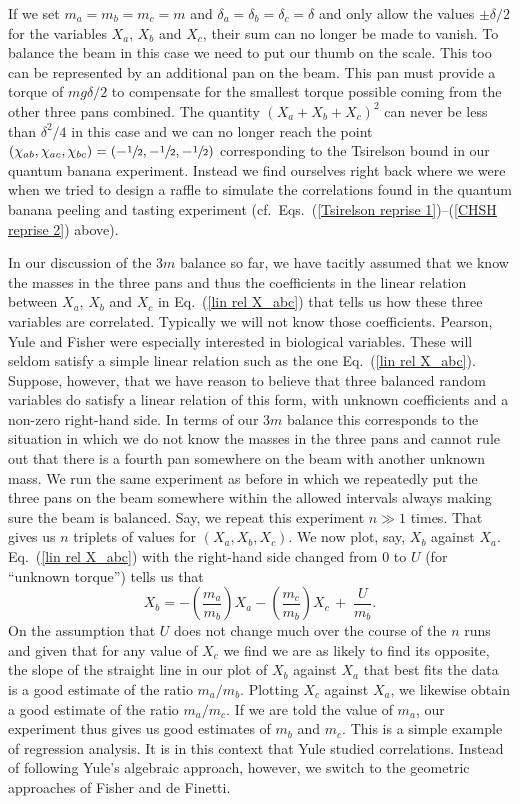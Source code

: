 If we set $m_a = m_b = m_ c =m$ and $\delta_a = \delta_b = \delta_c = \delta$  and only allow the values $\pm \delta/2$ for the variables $X_a$, $X_b$ and $X_c$, their sum can no longer be made to vanish. To balance the beam in this case we need to put our thumb on the scale. This too can be represented by an additional pan on the beam. This pan must provide a torque of $mg\delta/2$ to compensate for the smallest torque possible coming from the other three pans combined. The quantity $\left(X_a + X_b + X_c \right)^2$ can never be less than $\delta^2/4$ in this case and we can no longer reach the point $(\chi_{ab}, \chi_{ac}, \chi_{bc}) = 
(-\sfrac12, -\sfrac12, -\sfrac12)$ corresponding to the Tsirelson bound in our quantum banana experiment. Instead we find ourselves right back where we were when we tried to design a raffle to simulate the correlations found in the quantum banana peeling and tasting experiment (cf.\ Eqs.\ (\ref{Tsirelson reprise 1})--(\ref{CHSH reprise 2}) above). 

In our discussion of the 3$m$ balance so far, we have tacitly assumed that we know the masses in the three pans and thus the coefficients in the linear relation between $X_a$, $X_b$ and $X_c$ in Eq.\ (\ref{lin rel X_abc}) that tells us how these three variables are correlated. Typically we will not know those coefficients. Pearson, Yule and Fisher were especially interested in biological variables. These will seldom satisfy a simple linear relation such as the one Eq.\ (\ref{lin rel X_abc}). Suppose, however, that we have reason to believe that three balanced random variables do satisfy a linear relation of this form, with unknown coefficients and a non-zero right-hand side. In terms of our 3$m$ balance this corresponds to the situation in which we do not know the masses in the three pans and cannot rule out that there is a fourth pan somewhere on the beam with another unknown mass. We run the same experiment as before in which we repeatedly put the three pans on the beam somewhere within the allowed intervals always making sure the beam is balanced. Say, we repeat this experiment $n \gg 1$ times. That gives us $n$ triplets of values for $(X_a, X_b, X_c)$. We now plot, say, $X_b$ against $X_a$. Eq.\ (\ref{lin rel X_abc}) with the right-hand side changed from 0 to $U$ (for ``unknown torque'') tells us that
\begin{equation}
X_b  = - \left(\frac{m_a }{m_b} \right) X_a - \left( \frac{m_c}{m_b} \right) X_c \, + \; \frac{U}{m_b}.   
\end{equation}
On the assumption that $U$ does not change much over the course of the $n$ runs and given that for any value of $X_c$ we find we are as likely to find its opposite, the slope of the straight line in our plot of $X_b$ against $X_a$ that best fits the data is a good estimate of the ratio $m_a/m_b$. Plotting $X_c$ against $X_a$, we likewise obtain a good estimate of the ratio $m_a/m_c$. If we are told the value of $m_a$, our experiment thus gives us good estimates of $m_b$ and $m_c$. This is a simple example of regression analysis. It is in this context that Yule studied correlations. Instead of following Yule's algebraic approach, however, we switch to the geometric approaches of Fisher and de Finetti.

